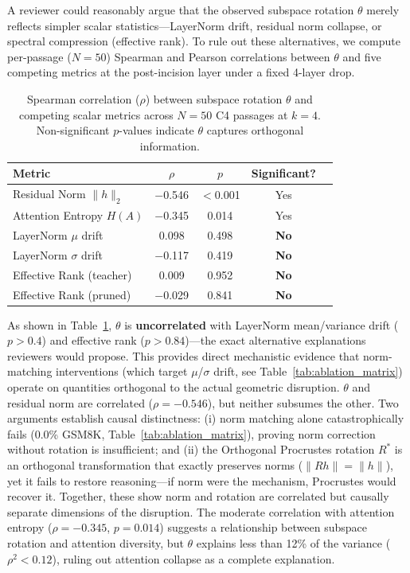 \documentclass[11pt]{article}
\begin{document}
A reviewer could reasonably argue that the observed subspace rotation $\theta$ merely reflects simpler scalar statistics---LayerNorm drift, residual norm collapse, or spectral compression (effective rank). To rule out these alternatives, we compute per-passage ($N=50$) Spearman and Pearson correlations between $\theta$ and five competing metrics at the post-incision layer under a fixed 4-layer drop.

\begin{table}[t!]
\centering
\footnotesize
\setlength{\tabcolsep}{2pt}
\caption{Spearman correlation ($\rho$) between subspace rotation $\theta$ and competing scalar metrics across $N=50$ C4 passages at $k=4$. Non-significant $p$-values indicate $\theta$ captures orthogonal information.}
\label{tab:competing_metrics}
\begin{tabular}{lcccc}
\toprule
\textbf{Metric} & $\rho$ & $p$ & \textbf{Significant?} \\
\midrule
Residual Norm $\|h\|_2$ & $-$0.546 & $<$0.001 & Yes \\
Attention Entropy $H(A)$ & $-$0.345 & 0.014 & Yes \\
LayerNorm $\mu$ drift & 0.098 & 0.498 & \textbf{No} \\
LayerNorm $\sigma$ drift & $-$0.117 & 0.419 & \textbf{No} \\
Effective Rank (teacher) & 0.009 & 0.952 & \textbf{No} \\
Effective Rank (pruned) & $-$0.029 & 0.841 & \textbf{No} \\
\bottomrule
\end{tabular}
\end{table}

As shown in Table~\ref{tab:competing_metrics}, $\theta$ is \textbf{uncorrelated} with LayerNorm mean/variance drift ($p > 0.4$) and effective rank ($p > 0.84$)---the exact alternative explanations reviewers would propose. This provides direct mechanistic evidence that norm-matching interventions (which target $\mu$/$\sigma$ drift, see Table~\ref{tab:ablation_matrix}) operate on quantities orthogonal to the actual geometric disruption. $\theta$ and residual norm are correlated ($\rho = -0.546$), but neither subsumes the other. Two arguments establish causal distinctness: (i) norm matching alone catastrophically fails (0.0\% GSM8K, Table~\ref{tab:ablation_matrix}), proving norm correction without rotation is insufficient; and (ii) the Orthogonal Procrustes rotation $R^*$ is an orthogonal transformation that exactly preserves norms ($\|Rh\| = \|h\|$), yet it fails to restore reasoning---if norm were the mechanism, Procrustes would recover it. Together, these show norm and rotation are correlated but causally separate dimensions of the disruption. The moderate correlation with attention entropy ($\rho = -0.345$, $p = 0.014$) suggests a relationship between subspace rotation and attention diversity, but $\theta$ explains less than 12\% of the variance ($\rho^2 < 0.12$), ruling out attention collapse as a complete explanation.
\end{document}

